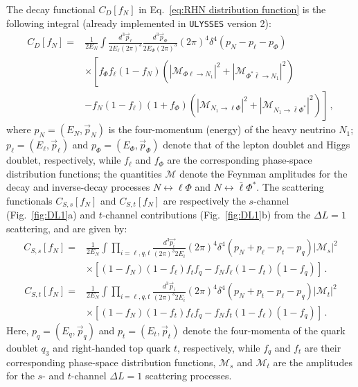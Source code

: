 \documentclass[12pt, a4paper]{article}
\begin{document}
 The decay functional $C_D[f_N]$ in Eq.~\eqref{eq:RHN distribution function} is the following integral \cite{Hahn-Woernle:2009jyb} (already implemented in \texttt{ULYSSES} version 2):
\begin{equation}
\label{eq:RHN decay}
 \begin{aligned}
  C_D\left[f_N\right]= & \frac{1}{2 E_N} \int \frac{d^3 \vec{p}_\ell}{2 E_\ell(2 \pi)^3} \frac{d^3\vec{p}_{\Phi}}{2 E_{\Phi}(2 \pi)^3}(2 \pi)^4 \delta^4\left(p_N-p_\ell-p_{\Phi}\right) \\
  & \times\left[f_{\Phi} f_\ell\left(1-f_N\right)\left(\left|\mathcal{M}_{\Phi \ell\rightarrow N_1}\right|^2+\left|\mathcal{M}_{ \Phi^* \bar{\ell}\rightarrow N_1}\right|^2\right)\right. \\
  & \left.-f_N\left(1-f_\ell\right)\left(1+f_{\Phi}\right)\left(\left|\mathcal{M}_{N_1 \rightarrow \ell\Phi }\right|^2+\left|\mathcal{M}_{N_1 \rightarrow \bar{\ell}\Phi^* }\right|^2\right)\right]\,,
 \end{aligned}
\end{equation}
 where $p_N=(E_N,\vec{p}_N)$ is the four-momentum (energy) of the heavy neutrino $N_1$; $p_\ell=(E_\ell,\vec{p}_\ell)$ and $p_\Phi=(E_\Phi,\vec{p}_\Phi)$ denote that of the lepton doublet and Higgs doublet, respectively, while $f_\ell$ and $f_\Phi$ are the corresponding phase-space distribution functions; the quantities $\mathcal{M}$ denote the Feynman amplitudes for the decay and inverse-decay processes $N \leftrightarrow \ell\Phi$ and $N \leftrightarrow \bar{\ell}\Phi^*$.
The scattering functionals $C_{S,s}[f_N]$ and $C_{S,t}[f_N]$ are respectively the 
$s$-channel (Fig.~\ref{fig:DL1}a) and $t$-channel contributions (Fig.~\ref{fig:DL1}b) from the $\Delta L=1$ scattering, and are given by: 
\begin{equation}
\label{eq:s-channel scattering}
 \begin{aligned}
C_{S, s}\left[f_N\right] = &\frac{1}{2 E_N} \int \prod_{i=\ell, q, t} \frac{d^3 \vec{p_i}}{(2 \pi)^3 2 E_i}(2 \pi)^4 \delta^4\left(p_N+p_\ell-p_t-p_q\right)\left|\mathcal{M}_s\right|^2 \\
& \times\left[\left(1-f_N\right)\left(1-f_\ell\right) f_t f_q-f_N f_\ell\left(1-f_t\right)\left(1-f_q\right)\right]\,.
\end{aligned}
\end{equation}
\begin{equation}
\label{eq:t-channel scattering}
 \begin{aligned}
C_{S, t}\left[f_N\right] = &\frac{1}{2 E_N} \int \prod_{i=\ell, q, t} \frac{d^3 \vec{p}_i}{(2 \pi)^3 2 E_i}(2 \pi)^4 \delta^4\left(p_N+p_t-p_\ell-p_q\right)\left|\mathcal{M}_t\right|^2 \\
& \times\left[\left(1-f_N\right)\left(1-f_t\right) f_\ell f_q-f_N f_t\left(1-f_\ell\right)\left(1-f_q\right)\right]\,.
\end{aligned}
\end{equation}
Here, $p_q=(E_q,\vec p_q)$ and $p_t=(E_t,\vec p_t)$ denote the four-momenta of the quark doublet $q_3$ and right-handed top quark $t$, respectively, while $f_q$ and $f_t$ are their corresponding phase-space distribution functions, $\mathcal{M}_s$ and $\mathcal{M}_t$ are the amplitudes for the $s$- and $t$-channel $\Delta L=1$ scattering processes.
\end{document}
